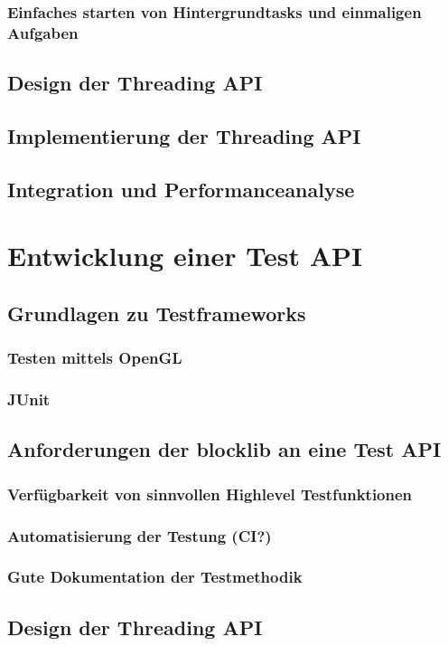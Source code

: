\documentclass[12pt,a4paper,listof=totocnumbered,parskip=half]{scrreprt}
\begin{document}
\subsection{Einfaches starten von Hintergrundtasks und einmaligen Aufgaben}
\section{Design der Threading API}
\section{Implementierung der Threading API}
\section{Integration und Performanceanalyse}

\chapter{Entwicklung einer Test API}
\section{Grundlagen zu Testframeworks}
\subsection{Testen mittels OpenGL}
\subsection{JUnit}
\section{Anforderungen der blocklib an eine Test API}
\subsection{Verfügbarkeit von sinnvollen Highlevel Testfunktionen}
\subsection{Automatisierung der Testung (CI?)}
\subsection{Gute Dokumentation der Testmethodik}
\section{Design der Threading API}
\end{document}
